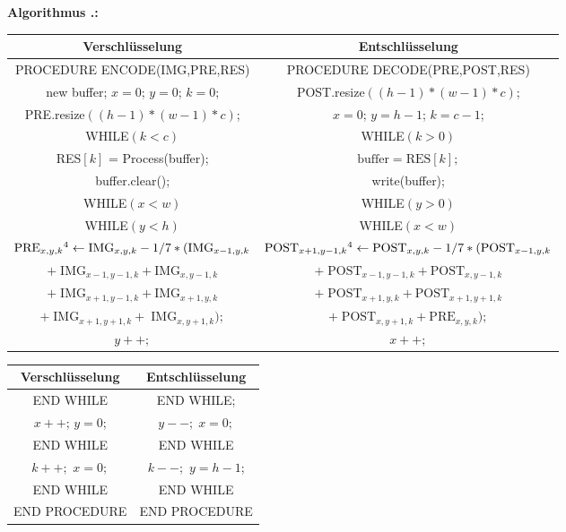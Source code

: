 \documentclass[a4paper,12pt]{article}
\newcounter{Algorithmus}
\newenvironment{Algorithmus}{
\medskip
        
        \setlength{\parindent}{0pt}
        \addtocounter{Algorithmus}{1}
        \textbf{\textsf{Algorithmus \thesubsection.\theAlgorithmus}:}}{
        \nopagebreak
        \vspace{-1.0ex}
        \bigskip
        
}
\begin{document}
\begin{Algorithmus}
\\
\begin{tabular}{c|c}
Verschlüsselung & Entschlüsselung
\\
\hline
PROCEDURE ENCODE(IMG,PRE,RES) & PROCEDURE DECODE(PRE,POST,RES)
\\
new buffer; $x=0$; $y=0$; $k=0$; & POST.resize$((h-1)*(w-1)*c)$;
\\
PRE.resize$((h-1)*(w-1)*c)$; & $x=0$; $y=h-1$; $k=c-1$;
\\
WHILE$(k < c)$ &                  WHILE$(k > 0)$
\\
RES$[k]$ = Process(buffer);  &  $\text{buffer} = \text{RES}[k];$
\\
buffer.clear(); & write(buffer);
\\
WHILE$(x < w)$ &   WHILE$(y > 0)$          
\\
WHILE$(y < h)$ &   WHILE$(x<w)$     
\\
$\text{PRE}_{x,y,k}\footnotemark[4]\leftarrow \text{IMG}_{x,y,k} - 1/7 *(\text{IMG}_{x-1,y,k}$ &  $\text{POST}_{x+1,y-1,k}\footnotemark[4]\leftarrow \text{POST}_{x,y,k} - 1/7 *(\text{POST}_{x-1,y,k} $ 
\\
$+\;\text{IMG}_{x-1,y-1,k} + \text{IMG}_{x,y-1,k}$ & $+\;\text{POST}_{x-1,y-1,k} + \text{POST}_{x,y-1,k}$  
\\
$+\;\text{IMG}_{x+1,y-1,k} + \text{IMG}_{x+1,y,k}$ & $+\;\text{POST}_{x+1,y,k} + \text{POST}_{x+1,y+1,k}  $
\\
 $+\;\text{IMG}_{x+1,y+1,k} +\;\text{IMG}_{x,y+1,k});$    &   $+\;\text{POST}_{x,y+1,k} + \text{PRE}_{x,y,k});$
\\
 $y++;$  & $x++;$
\end{tabular}
\begin{tabular}{c|c}
Verschlüsselung & Entschlüsselung
\\
\hline
END WHILE   & END WHILE;
\\
$x++$; $y=0$;    & $y--;\;x=0;$  
\\
END WHILE   & END WHILE 
\\
$k++;$ $x=0;$  &  $k--;$ $y=h-1$;
\\
END WHILE    &   END WHILE 
\\
END PROCEDURE & END PROCEDURE
\end{tabular}
\end{Algorithmus}
\end{document}
